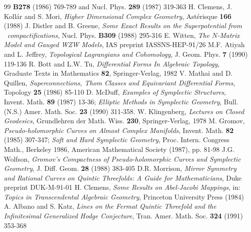 \begin{thebibliography}{99}
{\bf B278} (1986) 769-789 and Nucl. Phys. {\bf 289} (1987) 319-363
 H. Clemens, J. Koll\'ar and S. Mori, {\em Higher
Dimensional Complex Geometry}, Ast\'erisque {\bf 166} (1988)
 J. Distler and B. Greene, {\em Some Exact Results
on the Superpotential from \CY\ compactifications},
Nucl. Phys. {\bf B309} (1988) 295-316
 E. Witten, {\em The $N$-Matrix Model and Gauged WZW
Models}, IAS preprint IASSNS-HEP-91/26
 M.F. Atiyah and L. Jeffrey, {\em Topological Lagrangians
and Cohomology}, J. Geom. Phys. {\bf 7} (1990) 119-136
 R. Bott and L.W. Tu, {\em Differential Forms In
Algebraic Topology}, Graduate Texts in Mathematics {\bf 82},
Springer-Verlag, 1982
 V. Mathai and D. Quillen, {\em Superconnections,
Thom Classes and Equivariant Differential Forms}, Topology {\bf 25}
(1986) 85-110
D. McDuff, {\em Examples of Symplectic Structures}, Invent. Math. {\bf 89}
(1987) 13-36;
{\em Elliptic Methods in Symplectic Geometry}, Bull. (N.S.) Amer. Math. Soc.
{\bf 23} (1990) 311-358.
W. Klingenberg, {\em Lectures on Closed Geodesics}, Grundlehren der Math.
Wiss. {\bf 230}, Springer-Verlag, 1978
M. Gromov, {\em Pseudo-holomorphic Curves on Almost Complex Manifolds},
Invent. Math. {\bf 82} (1985) 307-347;
{\em Soft and Hard Symplectic Geometry}, Proc. Intern. Congress Math.,
Berkeley 1986, American Mathematical Society (1987), pp. 81-98
 J.G. Wolfson, {\em Gromov's Compactness of Pseudo-holomorphic
Curves and Symplectic Geometry}, J. Diff. Geom. {\bf 28} (1988) 383-405
 D.R. Morrison, {\em Mirror Symmetry and Rational
Curves on Quintic Threefolds: A Guide for Mathematicians},
Duke preprint DUK-M-91-01
 H. Clemens, {\em Some Results on Abel-Jacobi Mappings},
in: {\em Topics in Transcendental Algebraic Geometry}, Princeton
University Press (1984)
 A. Albano and S. Katz, {\em Lines on the Fermat
Quintic Threefold and the Infinitesimal Generalized Hodge Conjecture},
Tran. Amer. Math. Soc. {\bf 324} (1991) 353-368

\end{thebibliography}





